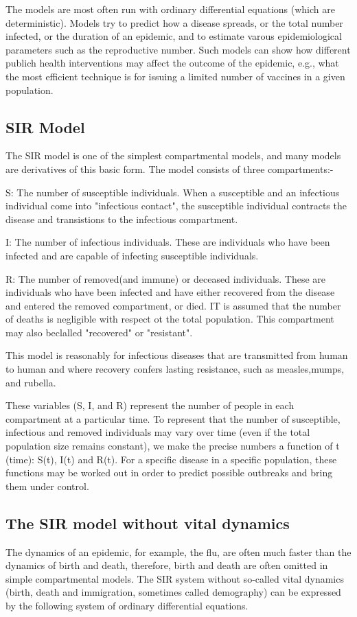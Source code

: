 \documentclass[a4paper, 12pt]{article}
\begin{document}
The models are most often run with ordinary differential equations (which are deterministic). Models try to predict how a disease spreads, or the total number infected, or the duration of an epidemic, and to estimate varous epidemiological parameters such as the reproductive number. Such models can show how different publich health interventions may affect the outcome of the epidemic, e.g., what the most efficient technique is for issuing a limited number of vaccines in a given population. 

\subsection{SIR Model}
The SIR model is one of the simplest compartmental models, and many models are derivatives of this basic form. The model consists of three compartments:-

S: The number of susceptible individuals. When a susceptible and an infectious individual come into "infectious contact", the susceptible individual contracts the disease and transistions to the infectious compartment.

I: The number of infectious individuals. These are individuals who have been infected and are capable of infecting susceptible individuals.

R: The number of removed(and immune) or deceased individuals. These are individuals who have been infected and have either recovered from the disease and entered the removed compartment, or died. IT is assumed that the number of deaths is negligible with respect ot the total population. This compartment may also beclalled "recovered" or "resistant".

This model is reasonably for infectious diseases that are transmitted from human to human and where recovery confers lasting resistance, such as measles,mumps, and rubella.

These variables (S, I, and R) represent the number of people in each compartment at a particular time. To represent that the number of susceptible, infectious and removed individuals may vary over time (even if the total population size remains constant), we make the precise numbers a function of t (time): S(t), I(t) and R(t). For a specific disease in a specific population, these functions may be worked out in order to predict possible outbreaks and bring them under control.

\subsection{The SIR model without vital dynamics}
The dynamics of an epidemic, for example, the flu, are often much faster than the dynamics of birth and death, therefore, birth and death are often omitted in simple compartmental models. The SIR system without so-called vital dynamics (birth, death and immigration, sometimes called demography) can be expressed by the following system of ordinary differential equations.
\end{document}
